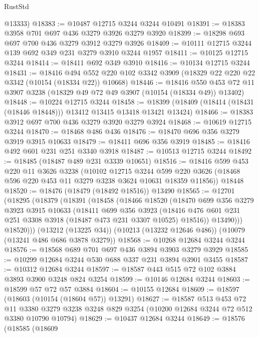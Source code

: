 \begin{lexlean}{RustStd}
\begin{coremodule}
{\begin{coremodule}
{{{{{{{{{{{{{{{{{{{{{{{{{{      @13333)
@18383 := @10487 @12715 @3244 @3244 @10491
@18391 := @18383 @3958 @701 @697 @436 @3279 @3926 @3279 @3920
@18399 := @18298 @693 @697 @700 @436 @3279 @3912 @3279 @3926
@18409 := @10111 @12715 @3244 @139 @692 @349 @231 @3279 @3910 @3244 @1957
@18411 := @10125 @12715 @3244
@18414 := @18411 @692 @349 @3910
@18416 := @10134 @12715 @3244
@18431 := @18416
    @494
    @552
    @220
    @102
    @3342
    @3909
    (@18329 @22 @220 @22 @3342 (@10154 (@18334 @22)) @10668)
@18446 := @18416
    @550
    @453
    @72
    @11
    @3907
    @3238
    (@18329 @49 @72 @49 @3907 (@10154 (@18334 @49)) @13402)
@18448 := @10224 @12715 @3244
@18458 := @18399 (@18409 (@18414 (@18431 (@18446 @18448))) @13412 @13415 @13418 @13421 @13424)
@18466 := @18383 @3912 @697 @700 @436 @3279 @3920 @3279 @3924
@18468 := @10619 @12715 @3244
@18470 := @18468 @486 @436
@18476 := @18470 @696 @356 @3279 @3919 @3915 @10633
@18479 := @18411 @696 @356 @3919
@18485 := @18416 @492 @601 @231 @251 @3340 @3918
@18487 := @10513 @12715 @3244
@18492 := @18485 (@18487 @489 @231 @3339 @10651)
@18516 := @18416
    @599
    @453
    @220
    @11
    @3626
    @3238
    (@10102
      @12715
      @3244
      @599
      @220
      @3626
      (@18468 @596 @220 @453 @11 @3279 @3238 @3624 @10631 @18359 @11856))
    @18448
@18520 := @18476 (@18479 (@18492 @18516)) @13490
@18565 := @12701
    (@18295
      (@18379
        (@18391
          (@18458
            (@18466
              @18520
              (@18470
                @699
                @356
                @3279
                @3923
                @3915
                @10633
                (@18411
                  @699
                  @356
                  @3923
                  (@18416 @476 @601 @231 @251 @3308 @3918 (@18487 @473 @231 @3307 @10525) @18516))
                @13490)))
          @18520)))
    (@13212 (@13225 @34))
    (@10213 (@13232 @12646 @486))
    (@10079 (@13241 @486 @686 @3878 @3279))
@18568 := @10268 @12684 @3244 @3244
@18576 := @18568 @689 @701 @697 @436 @3894 @3903 @3279 @3929
@18585 := @10299 @12684 @3244 @530 @688 @337 @231 @3894 @3901 @3455
@18587 := @10312 @12684 @3244
@18597 := @18587 @443 @515 @72 @102 @3884 @3893 @3900 @3248 @824 @3254
@18599 := @10146 @12684 @3244
@18603 := @18599 @57 @72 @57 @3884
@18604 := @10155 @12684
@18609 := @18597 (@18603 (@10154 (@18604 @57)) @13291)
@18627 := @18587
    @513
    @453
    @72
    @11
    @3380
    @3279
    @3238
    @3248
    @829
    @3254
    (@10200 @12684 @3244 @72 @512 @3380 @10790 @10794)
@18629 := @10437 @12684 @3244
@18649 := @18576
    (@18585
      (@18609
}}}}}}}}}}}}}}}}}}}}}}}}}}
\end{coremodule}}
\end{coremodule}
\end{lexlean}
